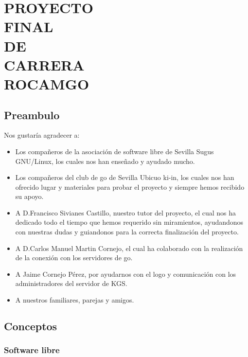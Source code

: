 \documentclass[12pt,a4paper]{report}
\author{David Medina Velasco \and Víctor Ramírez de la Corte}
\begin{document}
\part*{PROYECTO\\ FINAL\\ DE \\CARRERA \\ ROCAMGO\\}

\marginsize{3cm}{2cm}{2cm}{2cm} %
\tableofcontents  %

 
\chapter*{Preambulo} 

Nos gustaría agradecer a: 
\begin{itemize} 
    \item Los compañeros de la asociación de software libre de Sevilla Sugus 
    GNU/Linux, los cuales nos han enseñado y ayudado mucho.  
    \item Los compañeros del club de go de Sevilla Ubicuo ki-in, los cuales nos
    han ofrecido lugar y materiales para probar el proyecto y siempre hemos 
    recibido su apoyo.  
    \item A D.Francisco Sivianes Castillo, nuestro tutor del proyecto, el cual 
    nos ha dedicado todo el tiempo que hemos requerido sin miramientos, 
    ayudandonos con nuestras dudas y guiandonos para la correcta finalización 
    del proyecto.  
    \item A D.Carlos Manuel Martin Cornejo, el cual ha colaborado con la 
    realización de la conexión con los servidores de go.  
    \item A Jaime Cornejo Pérez, por ayudarnos con el logo y comunicación con 
    los administradores del servidor de KGS.  
    \item A nuestros familiares, parejas y amigos.
\end{itemize}


\chapter{Conceptos}

\section{Software libre}
\end{document}
